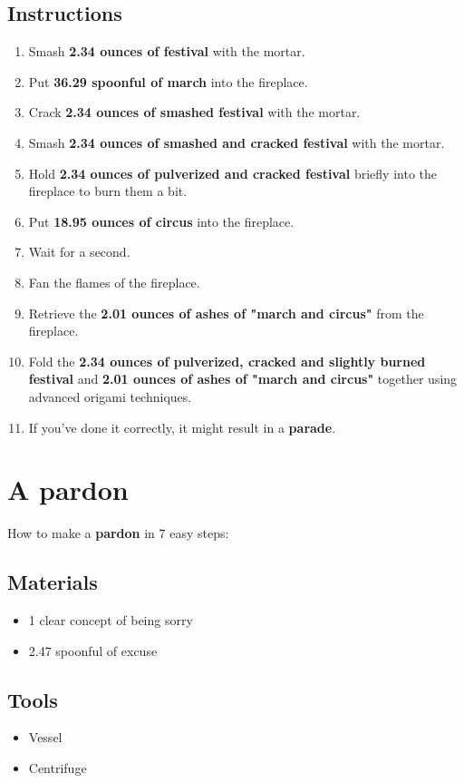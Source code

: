 \documentclass{article}
\begin{document}
\subsection{Instructions}\begin{enumerate}
\item 
Smash \textbf{2.34 ounces of festival} with the mortar.
\item 
Put \textbf{36.29 spoonful of march} into the fireplace.
\item 
Crack \textbf{2.34 ounces of smashed festival} with the mortar.
\item 
Smash \textbf{2.34 ounces of smashed and cracked festival} with the mortar.
\item 
Hold \textbf{2.34 ounces of pulverized and cracked festival} briefly into the fireplace to burn them a bit.
\item 
Put \textbf{18.95 ounces of circus} into the fireplace.
\item 
Wait for a second.
\item 
Fan the flames of the fireplace.
\item 
Retrieve the \textbf{2.01 ounces of ashes of "march and circus"} from the fireplace.
\item 
Fold the \textbf{2.34 ounces of pulverized, cracked and slightly burned festival} and \textbf{2.01 ounces of ashes of "march and circus"} together using advanced origami techniques.
\item 
If you've done it correctly, it might result in a \textbf{parade}.
\end{enumerate}
\newpage
\section{A pardon}How to make a \textbf{pardon} in 7 easy steps:

\subsection{Materials}\begin{itemize}
\item 
1 clear concept of being sorry
\item 
2.47 spoonful of excuse
\end{itemize}
\subsection{Tools}\begin{itemize}
\item 
Vessel
\item 
Centrifuge
\end{itemize}
\end{document}

